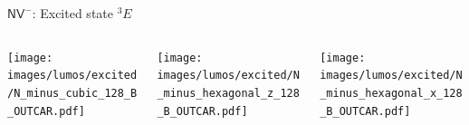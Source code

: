 \documentclass[]{beamer}
\begin{document}
\begin{frame}{ $ \mathsf{NV}^{-} $: Excited state $ ^3E $ }
  \begin{center}
    \begin{columns}
      \begin{column}{0.3\textwidth}
        \texttt{[image: images/lumos/excited/N\_minus\_cubic\_128\_B\_OUTCAR.pdf]}
      \end{column}
      \begin{column}{0.3\textwidth}
        \texttt{[image: images/lumos/excited/N\_minus\_hexagonal\_z\_128\_B\_OUTCAR.pdf]}
      \end{column}
      \begin{column}{0.3\textwidth}
        \texttt{[image: images/lumos/excited/N\_minus\_hexagonal\_x\_128\_B\_OUTCAR.pdf]}
      \end{column}
    \end{columns}
  \end{center}
\end{frame}
\end{document}
